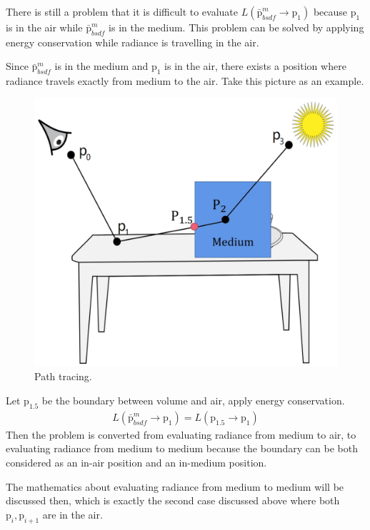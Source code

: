 \documentclass[acmtog]{acmart}
\def\p{\mathrm{p}}
\def\pp#1#2{\p_{#1}\rightarrow\p_{#2}}
\begin{document}
    There is still a problem that it is difficult to evaluate $L(\bar{\p}^m_{bsdf}\rightarrow\p_1)$ because 
    $\p_1$ is in the air while $\bar{\p}^m_{bsdf}$ is in the medium.
    This problem can be solved by applying energy conservation while radiance is travelling in the air.\par
        Since $\bar{\p}^m_{bsdf}$ is in the medium and $\p_1$ is in the air, 
    there exists a position where radiance travels exactly from medium to the air.
    Take this picture as an example.
\begin{figure}[H]
    \includegraphics[scale=0.045]{pictures/volume path tracing.jpg}
    \centering
    \caption{Path tracing.}
\end{figure}
    Let $\p_{1.5}$ be the boundary between volume and air, apply energy conservation.
\begin{equation} \label{eq10}
\begin{split}
    L(\bar{\p}^m_{bsdf}\rightarrow\p_1) = L(\pp{1.5}{1})
\end{split}
\end{equation}
    Then the problem is converted from evaluating radiance from medium to air, to evaluating radiance from medium to medium
    because the boundary can be both considered as an in-air position and an in-medium position.\par
        The mathematics about evaluating radiance from medium to medium will be discussed then, 
    which is exactly the second case discussed above where both $\p_i,\p_{i+1}$ are in the air.
\end{document}
